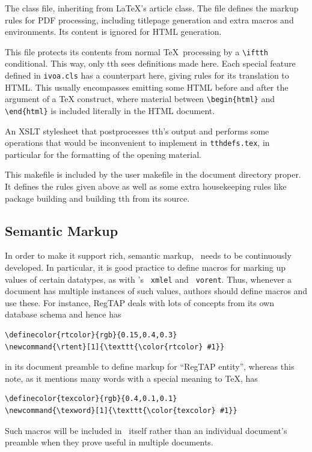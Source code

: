 \documentclass[11pt,a4paper]{ivoa}
\newcommand{\texword}[1]{\texttt{\color{texcolor} #1}}
\begin{document}
\begin{bigdescription}
\item[ivoa.cls] The class file, inheriting from \LaTeX's article class.
The file defines the markup rules for PDF processing, including
titlepage generation and extra macros and environments.  Its content is
ignored for HTML generation.

\item[tthdefs.tex] This file protects its contents from normal \TeX\
processing by a \verb|\iftth| conditional. This way, only tth sees
definitions made here. Each special feature defined in \texttt{ivoa.cls}
has a counterpart here, giving rules for its translation to HTML.  This
usually encompasses emitting some HTML before and after the argument of
a TeX construct, where material between \verb|\begin{html}| and
\verb|\end{html}| is included literally in the HTML document.

\item[tth-ivoa.xslt] An XSLT stylesheet that postprocesses tth's output
and performs some operations that would be inconvenient to implement in
\texttt{tthdefs.tex}, in particular for the formatting of the opening
material.

\item[Makefile] This makefile is included by the user makefile in the
document directory proper.  It defines the rules given above as well as
some extra housekeeping rules like package building and building tth
from its source.

\end{bigdescription}

\subsection{Semantic Markup}

In order to make it support rich, semantic markup, \ivoatex\ needs to be
continuously developed.  In particular, it is good practice to define
macros for marking up values of certain datatypes, as with \ivoatex's
\texword{xmlel} and \texword{vorent}.
Thus, whenever a document has multiple
instances of such values, authors should define macros and use these.
For instance, RegTAP deals with lots of concepts from its own
database schema and hence has
\begin{lstlisting}
\definecolor{rtcolor}{rgb}{0.15,0.4,0.3}
\newcommand{\rtent}[1]{\texttt{\color{rtcolor} #1}}
\end{lstlisting}
in its document preamble to
define markup for ``RegTAP entity'', whereas
this note, as it mentions many words with a special meaning to \TeX, has
\begin{lstlisting}
\definecolor{texcolor}{rgb}{0.4,0.1,0.1}
\newcommand{\texword}[1]{\texttt{\color{texcolor} #1}}
\end{lstlisting}
Such macros will be included in \ivoatex\ itself rather than an
individual document's preamble when they prove useful in multiple
documents.
\end{document}

